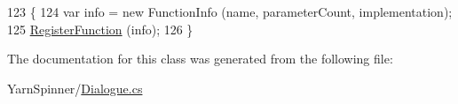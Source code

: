\begin{DoxyCode}
123                                                                                                \{
124             var info = \textcolor{keyword}{new} FunctionInfo (name, parameterCount, implementation);
125             \hyperlink{a00103_a001ab29d21fe7db10fc9c250914287f9}{RegisterFunction} (info);
126         \}
\end{DoxyCode}


The documentation for this class was generated from the following file\-:\begin{DoxyCompactItemize}
\item 
Yarn\-Spinner/\hyperlink{a00265}{Dialogue.\-cs}\end{DoxyCompactItemize}
